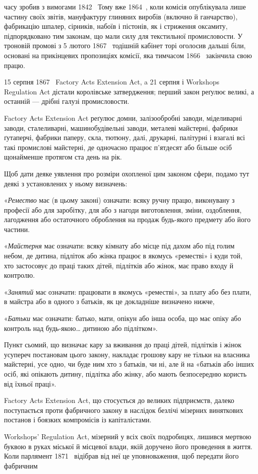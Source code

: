 \parcont{}  %
часу зробив з вимогами 1842~ Тому вже 1864~, коли комісія
опублікувала лише частину своїх звітів, мануфактуру глиняних
виробів (включно й ганчарство), фабрикацію шпалер, сірників,
набоїв і пістонів, як і стриження оксамиту, підпорядковано
тим законам, що мали силу для текстильної промисловости.
У троновій промові з 5 лютого 1867~ тодішній кабінет торі
оголосив дальші біли, основані на прикінцевих пропозиціях
комісії, яка тимчасом 1866~ закінчила свою працю.

\label{original-414}15 серпня 1867~ Factory Acts Extension Act, a 21 серпня і
Workshops Regulation Act дістали королівське затвердження;
перший закон реґулює великі, а останній — дрібні галузі промисловости.

Factory Acts Extension Act реґулює домни, залізообробні
заводи, міделиварні заводи, сталеливарні, машинобудівельні заводи,
металеві майстерні, фабрики ґутаперчі, фабрики паперу,
скла, тютюну, далі, друкарні, палітурні і взагалі всі такі промислові
майстерні, де одночасно працює п’ятдесят або більше осіб
щонайменше протягом ста день на рік.

Щоб дати деяке уявлення про розміри охопленої цим законом
сфери, подамо тут деякі з установлених у ньому визначень:

«\emph{Ремество} має (в цьому законі) означати: всяку ручну
працю, виконувану з професії або для заробітку, для або з
нагоди виготовлення, зміни, оздоблення, лагодження або остаточного
оброблення на продаж будь-якого предмету або його
частини.

«\emph{Майстерня} має означати: всяку кімнату або місце під дахом
або під голим небом, де дитина, підліток або жінка працює в
якомусь «реместві» і куди той, хто застосовує до праці таких
дітей, підлітків або жінок, має право входу й контролю.

«\emph{Занятий} має означати: працювати в якомусь «реместві»,
за плату або без плати, в майстра або в одного з батьків, як це
докладніше визначено нижче,

«\emph{Батьки} має означати: батько, мати, опікун або інша особа,
що має опіку або контроль над будь-якою\dots{} дитиною або підлітком».

Пункт сьомий, що визначає кару за вживання до праці дітей,
підлітків і жінок усупереч постановам цього закону, накладає
грошову кару не тільки на власника майстерні, усе одно, чи буде
ним хто з батьків, чи ні, але й на «батьків або інших осіб, які
опікають дитину, підлітка або жінку, або мають безпосередню
користь від їхньої праці».

Factory Acts Extension Act, що стосується до великих підприємств,
далеко поступається проти фабричного закону в наслідок
безлічі мізерних виняткових постанов і боязких компромісів
із капіталістами.

Workshops’ Regulation Act, мізерний у всіх своїх подробицях,
лишився мертвою буквою в руках міської й місцевої влади, якій
доручено його проведення в життя. Коли парлямент 1871~
відібрав від неї це уповноваження, щоб передати його фабричним
\parbreak{}  %
